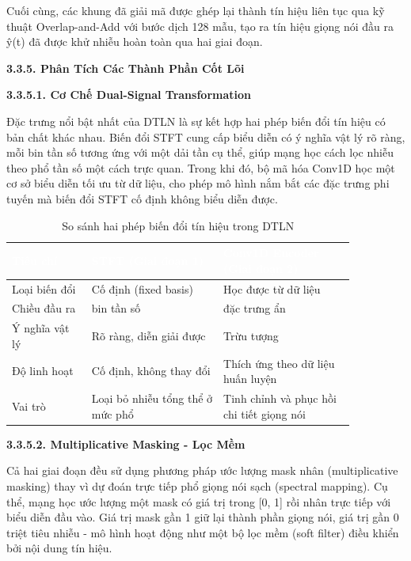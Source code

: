 \documentclass[
  13pt,
]{article}
\begin{document}
Cuối cùng, các khung đã giải mã được ghép lại thành tín hiệu liên tục
qua kỹ thuật Overlap-and-Add với bước dịch 128 mẫu, tạo ra tín hiệu
giọng nói đầu ra ŷ(t) đã được khử nhiễu hoàn toàn qua hai giai đoạn.

\textbf{3.3.5. Phân Tích Các Thành Phần Cốt Lõi}

\textbf{3.3.5.1. Cơ Chế Dual-Signal Transformation}

Đặc trưng nổi bật nhất của DTLN là sự kết hợp hai phép biến đổi tín hiệu
có bản chất khác nhau. Biến đổi STFT cung cấp biểu diễn có ý nghĩa vật
lý rõ ràng, mỗi bin tần số tương ứng với một dải tần cụ thể, giúp mạng
học cách lọc nhiễu theo phổ tần số một cách trực quan. Trong khi đó, bộ
mã hóa Conv1D học một cơ sở biểu diễn tối ưu từ dữ liệu, cho phép mô
hình nắm bắt các đặc trưng phi tuyến mà biến đổi STFT cố định không biểu
diễn được.

\begin{table}[htbp]
\centering
\caption{So sánh hai phép biến đổi tín hiệu trong DTLN}
\label{tab:dual-signal}
\begin{tabular}{>{\raggedright\arraybackslash}p{0.2\linewidth} >{\centering\arraybackslash}p{0.33\linewidth} >{\centering\arraybackslash}p{0.33\linewidth}}
\toprule
\rowcolor{headerblue} \textcolor{white}{\textbf{Tiêu chí}} & \textcolor{white}{\textbf{STFT (Giai đoạn 1)}} & \textcolor{white}{\textbf{Conv1D Encoder (Giai đoạn 2)}} \\
\midrule
\rowcolor{rowgray} Loại biến đổi & Cố định (fixed basis) & Học được từ dữ liệu \\
Chiều đầu ra & 257 bin tần số & 256 đặc trưng ẩn \\
\rowcolor{rowgray} Ý nghĩa vật lý & Rõ ràng, diễn giải được & Trừu tượng \\
Độ linh hoạt & Cố định, không thay đổi & Thích ứng theo dữ liệu huấn luyện \\
\rowcolor{rowgray} Vai trò & Loại bỏ nhiễu tổng thể ở mức phổ & Tinh chỉnh và phục hồi chi tiết giọng nói \\
\bottomrule
\end{tabular}
\end{table}


\textbf{3.3.5.2. Multiplicative Masking - Lọc Mềm}

Cả hai giai đoạn đều sử dụng phương pháp ước lượng mask nhân
(multiplicative masking) thay vì dự đoán trực tiếp phổ giọng nói sạch
(spectral mapping). Cụ thể, mạng học ước lượng một mask có giá trị trong
{[}0, 1{]} rồi nhân trực tiếp với biểu diễn đầu vào. Giá trị mask gần 1
giữ lại thành phần giọng nói, giá trị gần 0 triệt tiêu nhiễu - mô hình
hoạt động như một bộ lọc mềm (soft filter) điều khiển bởi nội dung tín
hiệu.
\end{document}
